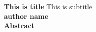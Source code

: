 \documentclass{article}
\begin{document}
\thispagestyle{plain}
\begin{center}
\large
\textbf{This is title }
\vspace{0.4cm}
\large
This is subtitle\\
\vspace{0.4cm}
\textbf{author name}\\
\vspace{0.4cm}
\textbf{Abstract}\\
\end{center}
\lipsum[1]
\end{document}
